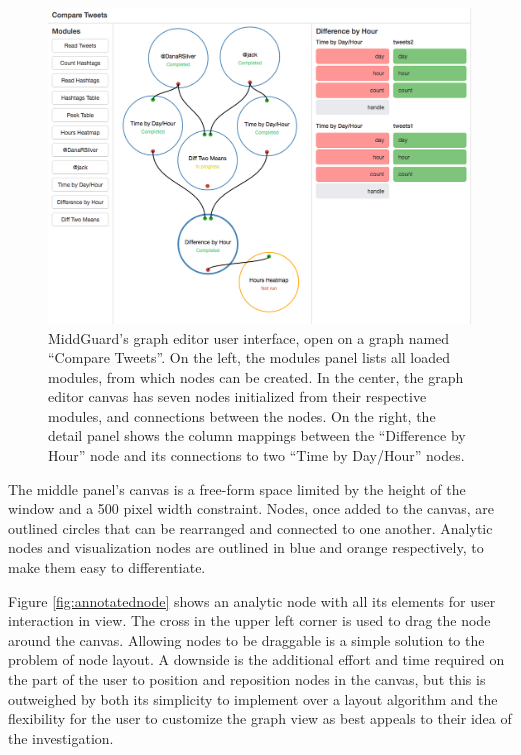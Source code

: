 \documentclass[midd]{thesis}
\begin{document}
\begin{figure}[!ht]
  \centering
  \includegraphics[width=1\textwidth]{compare-tweets-graph-editor-no-sidebar}
  \caption[MiddGuard's graph editor user interface.]{MiddGuard's graph editor
  user interface, open on a graph named ``Compare Tweets''. On the left, the
  modules panel lists all loaded modules, from which nodes can be created. In
  the center, the graph editor canvas has seven nodes initialized from their
  respective modules, and connections between the nodes. On the right, the
  detail panel shows the column mappings between the ``Difference by Hour'' node
  and its connections to two ``Time by Day/Hour'' nodes.}
  \label{fig:grapheditor}
\end{figure}

The middle panel's canvas is a free-form space limited by the height of the
window and a 500 pixel width constraint. Nodes, once added to the canvas, are
outlined circles that can be rearranged and connected to one another. Analytic
nodes and visualization nodes are outlined in blue and orange respectively, to
make them easy to differentiate.

Figure \ref{fig:annotatednode} shows an analytic node with all its elements for
user interaction in view. The cross in the upper left corner is used to drag the
node around the canvas. Allowing nodes to be draggable is a simple solution to
the problem of node layout. A downside is the additional effort and time
required on the part of the user to position and reposition nodes in the canvas,
but this is outweighed by both its simplicity to implement over a layout
algorithm and the flexibility for the user to customize the graph view as best
appeals to their idea of the investigation.
\end{document}
